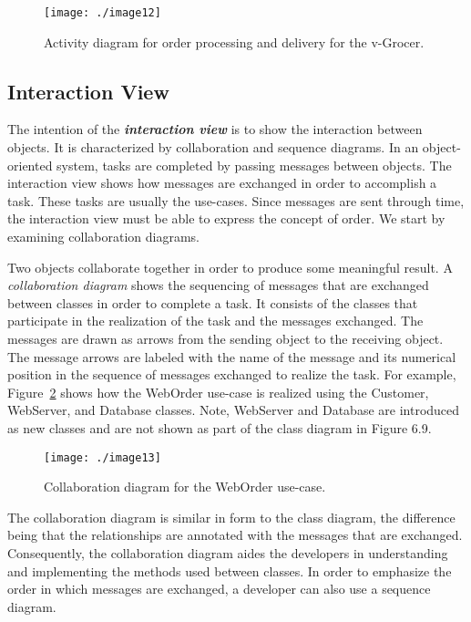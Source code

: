 \begin{figure}
\texttt{[image: ./image12]}
\caption{Activity diagram for order processing and delivery
for the v-Grocer.}
\label{figure:activityDiagramVgrocer}
\end{figure}

\subsection{Interaction View}
\label{subsection:interaction-view}

The intention of the \emph{\textbf{interaction view}} is to show the
interaction between objects. It is characterized by collaboration and
sequence diagrams. In an object-oriented system, tasks are completed by
passing messages between objects. The interaction view shows how
messages are exchanged in order to accomplish a task. These tasks are
usually the use-cases. Since messages are sent through time, the
interaction view must be able to express the concept of order. We start
by examining collaboration diagrams.

Two objects collaborate together in order to produce some meaningful
result. A \emph{collaboration diagram} shows the sequencing of messages
that are exchanged between classes in order to complete a task. It
consists of the classes that participate in the realization of the task
and the messages exchanged. The messages are drawn as arrows from the
sending object to the receiving object. The message arrows are labeled
with the name of the message and its numerical position in the sequence
of messages exchanged to realize the task. For example, 
Figure~\ref{figure:collaborationDiagramWebOrder}
shows how the WebOrder use-case is realized using the Customer,
WebServer, and Database classes. Note, WebServer and Database are
introduced as new classes and are not shown as part of the class diagram
in Figure 6.9.

\begin{figure}
\texttt{[image: ./image13]}
\caption{Collaboration diagram for the WebOrder use-case.}
\label{figure:collaborationDiagramWebOrder}
\end{figure}


The collaboration diagram is similar in form to the class diagram, the
difference being that the relationships are annotated with the messages
that are exchanged. Consequently, the collaboration diagram aides the
developers in understanding and implementing the methods used between
classes. In order to emphasize the order in which messages are
exchanged, a developer can also use a sequence diagram.

